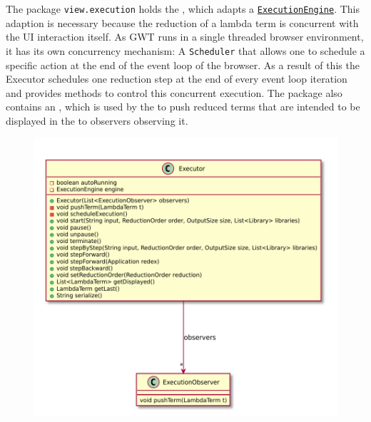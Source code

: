 The package \texttt{view.execution} holds the \texttt{}, which adapts a \texttt{\hyperref[type:edu.kit.wavelength.client.model.ExecutionEngine]{ExecutionEngine}}.
This adaption is necessary because the reduction of a lambda term is concurrent with the UI interaction itself. 
As GWT runs in a single threaded browser environment, it has its own concurrency mechanism: A \texttt{Scheduler} that allows one to schedule a specific action at the end of the event loop of the browser.
As a result of this the Executor schedules one reduction step at the end of every event loop iteration and provides methods to control this concurrent execution.
The package also contains an \texttt{}, which is used by the \texttt{} to push reduced terms that are intended to be displayed in the \texttt{} to observers observing it.

\begin{figure}[H]
	\centering
	\includegraphics[width=\textwidth]{packageDiagrams/executionPackage}
\end{figure}
